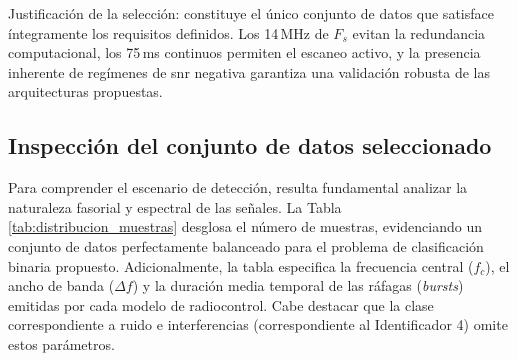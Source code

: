 Justificación de la selección: constituye el único conjunto de datos que satisface íntegramente los requisitos definidos. Los 14\,MHz de $F_s$ evitan la redundancia computacional, los 75\,ms continuos permiten el escaneo activo, y la presencia inherente de regímenes de \gls{snr} negativa garantiza una validación robusta de las arquitecturas propuestas.

\subsection{Inspección del conjunto de datos seleccionado}

Para comprender el escenario de detección, resulta fundamental analizar la naturaleza fasorial y espectral de las señales. La Tabla \ref{tab:distribucion_muestras} desglosa el número de muestras, evidenciando un conjunto de datos perfectamente balanceado para el problema de clasificación binaria propuesto. Adicionalmente, la tabla especifica la frecuencia central ($f_c$), el ancho de banda ($\Delta f$) y la duración media temporal de las ráfagas (\textit{bursts}) emitidas por cada modelo de radiocontrol. Cabe destacar que la clase correspondiente a ruido e interferencias (correspondiente al Identificador 4) omite estos parámetros.

\begin{table}[htbp]
\centering
\small
\caption{Distribución de muestras en el conjunto de datos \textit{NoisyUAV v2}.}
\label{tab:distribucion_muestras}
\end{table}

